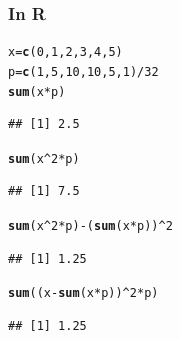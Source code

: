 \documentclass[t,xcolor=pdftex,dvipsnames,table]{beamer}
\makeatletter
\newcommand{\hlnum}[1]{\textcolor[rgb]{0.686,0.059,0.569}{#1}}%
\newcommand{\hlopt}[1]{\textcolor[rgb]{0,0,0}{#1}}%
\newcommand{\hlstd}[1]{\textcolor[rgb]{0.345,0.345,0.345}{#1}}%
\newcommand{\hlkwb}[1]{\textcolor[rgb]{0.69,0.353,0.396}{#1}}%
\newcommand{\hlkwd}[1]{\textcolor[rgb]{0.737,0.353,0.396}{\textbf{#1}}}%
\newenvironment{kframe}{%
 \def\at@end@of@kframe{}%
 \ifinner\ifhmode%
  \def\at@end@of@kframe{\end{minipage}}%
  \begin{minipage}{\columnwidth}%
 \fi\fi%
 \def\FrameCommand##1{\hskip\@totalleftmargin \hskip-\fboxsep
 \colorbox{shadecolor}{##1}\hskip-\fboxsep
     \hskip-\linewidth \hskip-\@totalleftmargin \hskip\columnwidth}%
 \MakeFramed {\advance\hsize-\width
   \@totalleftmargin\z@ \linewidth\hsize
   \@setminipage}}%
 {\par\unskip\endMakeFramed%
 \at@end@of@kframe}
\newenvironment{knitrout}{}{} %
\makeatother
\begin{document}
\begin{frame}[fragile]\frametitle{In R}
\begin{knitrout}
\color{fgcolor}\begin{kframe}
\begin{alltt}
\hlstd{x}\hlkwb{=}\hlkwd{c}\hlstd{(}\hlnum{0}\hlstd{,}\hlnum{1}\hlstd{,}\hlnum{2}\hlstd{,}\hlnum{3}\hlstd{,}\hlnum{4}\hlstd{,}\hlnum{5}\hlstd{)}
\hlstd{p}\hlkwb{=}\hlkwd{c}\hlstd{(}\hlnum{1}\hlstd{,}\hlnum{5}\hlstd{,}\hlnum{10}\hlstd{,}\hlnum{10}\hlstd{,}\hlnum{5}\hlstd{,}\hlnum{1}\hlstd{)}\hlopt{/}\hlnum{32}
\hlkwd{sum}\hlstd{(x}\hlopt{*}\hlstd{p)}
\end{alltt}
\begin{verbatim}
## [1] 2.5
\end{verbatim}
\begin{alltt}
\hlkwd{sum}\hlstd{(x}\hlopt{^}\hlnum{2}\hlopt{*}\hlstd{p)}
\end{alltt}
\begin{verbatim}
## [1] 7.5
\end{verbatim}
\begin{alltt}
\hlkwd{sum}\hlstd{(x}\hlopt{^}\hlnum{2}\hlopt{*}\hlstd{p)}\hlopt{-}\hlstd{(}\hlkwd{sum}\hlstd{(x}\hlopt{*}\hlstd{p))}\hlopt{^}\hlnum{2}
\end{alltt}
\begin{verbatim}
## [1] 1.25
\end{verbatim}
\begin{alltt}
\hlkwd{sum}\hlstd{((x}\hlopt{-}\hlkwd{sum}\hlstd{(x}\hlopt{*}\hlstd{p))}\hlopt{^}\hlnum{2}\hlopt{*}\hlstd{p)}
\end{alltt}
\begin{verbatim}
## [1] 1.25
\end{verbatim}
\end{kframe}
\end{knitrout}
\end{frame}
\end{document}
